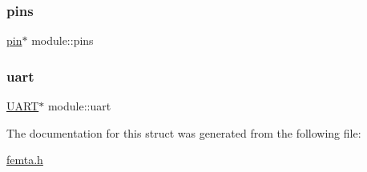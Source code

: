 \mbox{\label{structmodule_a3a758f16bbf56b5df5bfb1cfd7515fdb}} 
\subsubsection{\texorpdfstring{pins}{pins}}
{\footnotesize\ttfamily \hyperlink{structpin}{pin}$\ast$ module\+::pins}

\mbox{\label{structmodule_af74c4f29b898b255838d6b18731fa565}} 
\subsubsection{\texorpdfstring{uart}{uart}}
{\footnotesize\ttfamily \hyperlink{femta_8h_a13b3221f36ef9cb93c995303f10fed50}{U\+A\+RT}$\ast$ module\+::uart}



The documentation for this struct was generated from the following file\+:\begin{DoxyCompactItemize}
\item 
\hyperlink{femta_8h}{femta.\+h}\end{DoxyCompactItemize}
